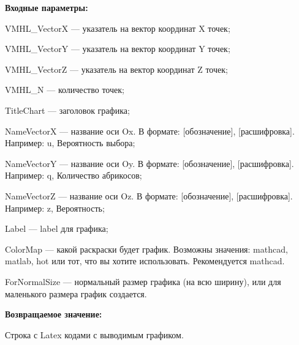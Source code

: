 \textbf{Входные параметры:}
 

VMHL\_VectorX --- указатель на вектор координат X точек;
 
    VMHL\_VectorY --- указатель на вектор координат Y точек;
 
    VMHL\_VectorZ --- указатель на вектор координат Z точек;
 
    VMHL\_N --- количество точек;
 
    TitleChart --- заголовок графика;
 
    NameVectorX --- название оси Ox. В формате: [обозначение], [расшифровка]. Например: u, Вероятность выбора;
 
    NameVectorY --- название оси Oy. В формате: [обозначение], [расшифровка]. Например: q, Количество абрикосов;
 
    NameVectorZ --- название оси Oz. В формате: [обозначение], [расшифровка]. Например: z, Вероятность;
 
    Label --- label для графика;
 
    ColorMap --- какой раскраски будет график. Возможны значения: mathcad, matlab, hot или тот, что вы хотите использовать. Рекомендуется mathcad.
 
    ForNormalSize --- нормальный размер графика (на всю ширину), или для маленького размера график создается.
	
\textbf{Возвращаемое значение:}

Строка с Latex кодами с выводимым графиком.